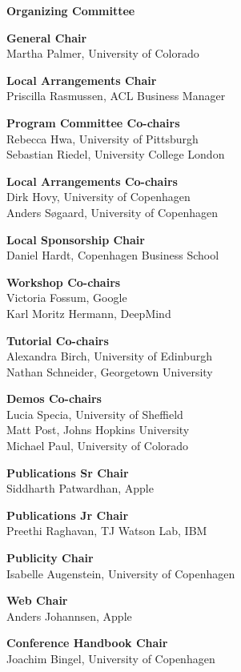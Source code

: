 \documentclass[11pt]{article}
\begin{document}
\begin{center}
  {\Large \bf Organizing Committee}
\end{center}

\vspace*{0.5cm}

{\bf General Chair} \\
Martha Palmer, University of Colorado

{\bf Local Arrangements Chair} \\
Priscilla Rasmussen, ACL Business Manager

{\bf Program Committee Co-chairs} \\
Rebecca Hwa, University of Pittsburgh \\
Sebastian Riedel, University College London

{\bf Local Arrangements Co-chairs} \\
Dirk Hovy, University of Copenhagen \\
Anders S{\o}gaard, University of Copenhagen

{\bf Local Sponsorship Chair} \\
Daniel Hardt, Copenhagen Business School

{\bf Workshop Co-chairs} \\
Victoria Fossum, Google\\
Karl Moritz Hermann, DeepMind

{\bf Tutorial Co-chairs} \\
Alexandra Birch, University of Edinburgh \\
Nathan Schneider, Georgetown University

{\bf Demos Co-chairs} \\
Lucia Specia, University of Sheffield \\
Matt Post, Johns Hopkins University \\
Michael Paul, University of Colorado

{\bf Publications Sr Chair} \\
Siddharth Patwardhan, Apple

{\bf Publications Jr Chair} \\
Preethi Raghavan, TJ Watson Lab, IBM

{\bf Publicity Chair}\\
Isabelle Augenstein, University of Copenhagen

{\bf Web Chair}\\
Anders Johannsen, Apple

{\bf Conference Handbook Chair}\\
Joachim Bingel, University of Copenhagen
\end{document}
